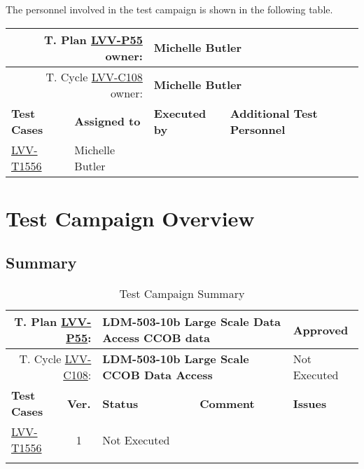 \documentclass[DM,lsstdraft,STR,toc]{lsstdoc}
\begin{document}
The personnel involved in the test campaign is shown in the following table.

{\small
\begin{longtable}{p{3cm}p{3cm}p{3cm}p{6cm}}
\hline
\multicolumn{2}{r}{T. Plan \href{https://jira.lsstcorp.org/secure/Tests.jspa\#/testPlan/LVV-P55}{LVV-P55} owner:} &
\multicolumn{2}{l}{\textbf{ Michelle Butler } }\\\hline
\multicolumn{2}{r}{T. Cycle \href{https://jira.lsstcorp.org/secure/Tests.jspa\#/testCycle/LVV-C108}{LVV-C108} owner:} &
\multicolumn{2}{l}{\textbf{
Michelle Butler}
} \\\hline
\textbf{Test Cases} & \textbf{Assigned to} & \textbf{Executed by} & \textbf{Additional Test Personnel} \\ \hline
\href{https://jira.lsstcorp.org/secure/Tests.jspa#/testCase/LVV-T1556}{LVV-T1556}
& {\small Michelle Butler } & {\small  } &
\begin{minipage}[]{6cm}
\smallskip
{\small  }
\medskip
\end{minipage}
\\ \hline
\end{longtable}
}

\newpage

\section{Test Campaign Overview}
\label{sect:overview}

\subsection{Summary}
\label{sect:summarytable}

{\small
\begin{longtable}{p{2cm}cp{2.3cm}p{8.6cm}p{2.3cm}}
\toprule
\multicolumn{2}{r}{ T. Plan \href{https://jira.lsstcorp.org/secure/Tests.jspa\#/testPlan/LVV-P55}{LVV-P55}:} &
\multicolumn{2}{p{10.9cm}}{\textbf{ LDM-503-10b Large Scale Data Access CCOB data }} & Approved \\\hline
\multicolumn{2}{r}{ T. Cycle \href{https://jira.lsstcorp.org/secure/Tests.jspa\#/testCycle/LVV-C108}{LVV-C108}:} &
\multicolumn{2}{p{10.9cm}}{\textbf{ LDM-503-10b Large Scale CCOB Data Access }} & Not Executed \\\hline
\textbf{Test Cases} &  \textbf{Ver.} & \textbf{Status} & \textbf{Comment} & \textbf{Issues} \\\toprule
\href{https://jira.lsstcorp.org/secure/Tests.jspa#/testCase/LVV-T1556}{LVV-T1556}
&  1
& Not Executed &
\begin{minipage}[]{9cm}
\smallskip

\medskip
\end{minipage}
&
\\\hline
\caption{Test Campaign Summary}
\label{table:summary}
\end{longtable}
}
\end{document}
